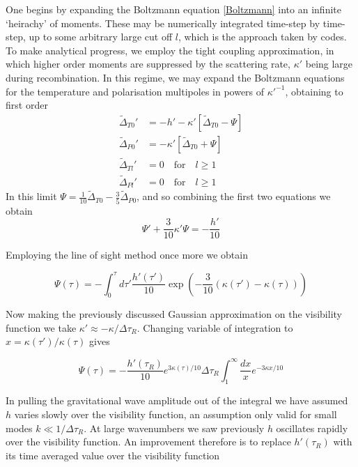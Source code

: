 \documentclass[a4paper,10pt]{article}
\begin{document}
One begins by expanding the Boltzmann equation \ref{Boltzmann} into an infinite `heirachy' of moments. These may be numerically integrated time-step by time-step, up to some arbitrary large cut off $l$, which is the approach taken by codes. To make analytical progress, we employ the tight coupling approximation, in which higher order moments are suppressed by the scattering rate, $\kappa'$ being large during recombination. In this regime, we may expand the Boltzmann equations for the temperature and polarisation multipoles in powers of $\kappa'^{-1}$, obtaining to first order
\begin{equation}
\begin{split}
\tilde{\Delta}_{T0}'&=-h'-\kappa'[\tilde{\Delta}_{T0}-\Psi]\\
\tilde{\Delta}_{P0}'&=-\kappa'[\tilde{\Delta}_{T0}+\Psi]\\
\tilde{\Delta}_{Tl}'&=0\quad\text{for} \quad l\geq1\\
\tilde{\Delta}_{Pl}'&=0\quad\text{for} \quad l\geq1
\end{split}
\end{equation}
In this limit $\Psi = \frac{1}{10}\tilde{\Delta}_{T0} - \frac{3}{5}\tilde{\Delta}_{P0}$, and so combining the first two equations we obtain
\begin{equation}
\Psi ' +\frac{3}{10}\kappa'\Psi = -\frac{h'}{10}
\end{equation}

Employing the line of sight method once more we obtain

\begin{equation}
\Psi(\tau) = -\int_0^\tau d\tau' \frac{h'(\tau')}{10}\exp{\left( -\frac{3}{10}(\kappa(\tau')-\kappa(\tau))\right)}
\end{equation}

Now making the previously discussed Gaussian approximation on the visibility function we take $\kappa'\approx -\kappa/\Delta\tau_R$. Changing variable of integration to $x=\kappa(\tau')/\kappa(\tau)$ gives

\begin{equation}
\Psi(\tau) = -\frac{h'(\tau_R)}{10}e^{3\kappa(\tau)/10}\Delta\tau_R\int_1^\infty\frac{dx}{x}e^{-3\kappa x/10}
\end{equation}

In pulling the gravitational wave amplitude out of the integral we have assumed $h$ varies slowly over the visibility function, an assumption only valid for small modes $k\ll 1/\Delta\tau_R$. At large wavenumbers we saw previously $h$ oscillates rapidly over the visibility function. An improvement therefore is to replace $h'(\tau_R)$ with its time averaged value over the visibility function
\end{document}
